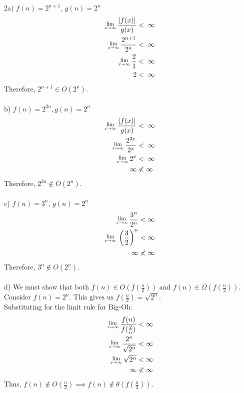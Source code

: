 \documentclass[12pt]{report}
\newcommand{\Lim}[1]{\raisebox{0.5ex}{\scalebox{0.8}{$\displaystyle \lim_{#1}\;$}}}
\newcommand{\MLim}{\Lim{x\rightarrow\infty}}
\newcommand{\no}{\noindent}
\newcommand{\tab}{\hspace*{.6cm}}
\begin{document}
	\pagebreak
	\no 2a) $f(n) = 2^{n+1} \text{, } g(n) = 2^n$ \\
	\begin{align*}
	\Lim{x\rightarrow\infty} \frac{|f(x)|}{g(x)} &< \; \infty \\
	\Lim{x\rightarrow\infty} \frac{2^{n+1}}{2^n} &< \; \infty \\
	\Lim{x\rightarrow\infty} \frac{2}{1} &< \; \infty \\
	2 &< \; \infty \\
	\end{align*}
	\tab Therefore, $2^{n+1} \in O(2^n)$.\\ \\
	\no b) $f(n) = 2^{2n}, g(n) = 2^n $
	\begin{align*}
	\MLim \frac{|f(x)|}{g(x)} &< \; \infty \\
	\MLim \frac{2^{2x}}{2^x} &< \; \infty \\
	\MLim 2^x &< \; \infty \\
	\infty &\nless \infty\\
	\end{align*}
	\tab Therefore, $2^{2n} \notin O(2^n)$.\\ \\
	\no c) $f(n) = 3^n $, $g(n) = 2^n$ \\
	\begin{align*}
	\MLim \frac{3^n}{2^n} &< \infty \\
	\MLim \left(\frac{3}{2}\right)^n &< \infty\\
	\infty &\nless \infty
	\end{align*}
	\tab Therefore, $ 3^n \notin O(2^n)$.\\ \\
	
	\pagebreak
	\no d) We must show that both $f(n) \in O(f(\frac{n}{2}))$ and $f(n) \in \Omega(f(\frac{n}{2}))$. Consider $f(n) = 2^n\text{. This gives us } f(\frac{n}{2}) = \sqrt{2^n}$. \\
	\tab Substituting for the limit rule for Big-Oh: \\
	\begin{align*}
	\MLim \frac{f(n)}{f(\frac{2}{n})} &< \infty \\
	\MLim \frac{2^n}{\sqrt{2^n}} &< \infty \\
	\MLim \sqrt{2^n} &< \infty \\
	\infty &\nless \infty
	\end{align*}
	\tab Thus, $f(n) \notin O(\frac{n}{2}) \implies f(n) \notin \theta(f(\frac{n}{2}))$. \\
	
\end{document}
